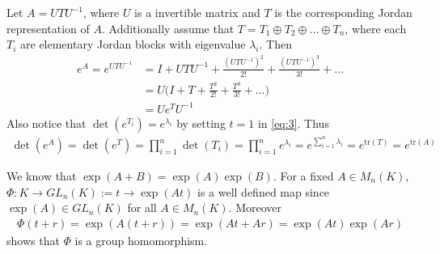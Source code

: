 \documentclass[12pt]{exam}
\theoremstyle{plain} %
\theoremstyle{definition} %
\theoremstyle{remark} %
\begin{document}
\begin{questions}
  \question
  \begin{solution}
    Let $A = UTU^{-1}$, where $U$ is a invertible matrix and $T$ is the
    corresponding Jordan representation of $A$. Additionally assume
    that $ T = T_1 \oplus T_2 \oplus \ldots \oplus T_n$, where each
    $T_i$ are elementary Jordan blocks with eigenvalue $\lambda_i$. Then
    \begin{align*}
      e^A  = e^{UTU^{-1}} &= I + UTU^{-1} + \frac{(UTU^{-1})^2}{2!} +
      \frac{(UTU^{-1})^3}{3!} + \ldots \\
      &= U \Big( I + T + \frac{T^2}{2!} + \frac{T^3}{3!}  + \ldots\Big) \\
      &= U e^T U^{-1}
    \end{align*}
    Also notice that $\det(e^{T_i})= e^{\lambda_i}$ by setting $t = 1$
    in \autoref{eq:3}. Thus
    \begin{align*}
      \det(e^A) = \det(e^T) = \prod_{i = 1}^{n} \det(T_i) = \prod_{i
      = 1}^{n}  e^{\lambda_i} = e^{\sum_{i = 1}^{n} \lambda_i} =
      e^{\textrm{tr}(T)} = e^{\textrm{tr}(A)}
    \end{align*}
  \end{solution}

  \question
  \begin{solution}
    We know that $\exp(A + B) = \exp(A)\exp(B)$. For a fixed $A \in
    M_n(K)$, $\Phi: K \to GL_n(K):= t \to \exp(At)$ is a well defined map
    since $\exp(A) \in GL_n(K)$ for all $A \in M_n(K)$. Moreover
    \begin{align*}
      \Phi(t + r) = \exp(A(t + r)) = \exp(At + Ar) = \exp(At)\exp(Ar)
    \end{align*}
    shows that $\Phi$ is a group homomorphism.
  \end{solution}

\end{questions}
\printbibliography[heading=bibintoc]
\end{document}
